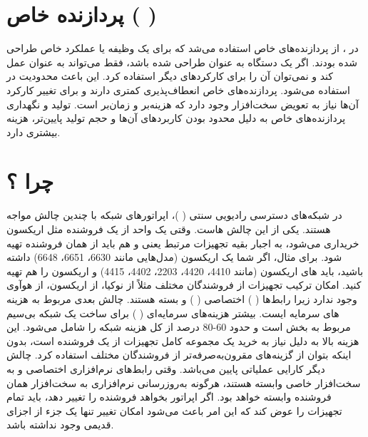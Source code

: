 \documentclass[landscape, 12pt]{report}
\begin{document}
 	         
\section*{پردازنده خاص  (
	)}
	در 
	، از پردازنده‌های خاص استفاده می‌شد که برای یک وظیفه یا عملکرد خاص طراحی شده بودند. اگر یک دستگاه به عنوان 
	 طراحی شده باشد، فقط می‌تواند به عنوان 
	 عمل کند و نمی‌توان آن را برای کارکردهای دیگر استفاده کرد. این باعث محدودیت در استفاده می‌شود. پردازنده‌های خاص انعطاف‌پذیری کمتری دارند و برای تغییر کارکرد آن‌ها نیاز به تعویض سخت‌افزار وجود دارد که هزینه‌بر و زمان‌بر است. تولید و نگهداری پردازنده‌های خاص به دلیل محدود بودن کاربردهای آن‌ها و حجم تولید پایین‌تر، هزینه بیشتری دارد.
	 
	 
\section*{چرا 
	 ؟}
	در شبکه‌های دسترسی رادیویی سنتی (
	)، اپراتورهای شبکه با چندین چالش مواجه هستند.
	  یکی از این چالش هاست. وقتی یک واحد
	    از یک فروشنده مثل اریکسون خریداری می‌شود، به اجبار بقیه تجهیزات مرتبط یعنی
	      و
	        هم باید از همان فروشنده تهیه شود. برای مثال، اگر شما یک
	         اریکسون (مدل‌هایی مانند 6630، 6651، 6648) داشته باشید، باید
	          های اریکسون (مانند 4410، 4420، 2203، 4402، 4415) و
	            اریکسون را هم تهیه کنید. امکان ترکیب تجهیزات از فروشندگان مختلف مثلاً
	              از نوکیا،
	                از اریکسون،
	                  از هوآوی وجود ندارد زیرا رابط‌ها (
	                  )  اختصاصی (
) و بسته هستند. چالش بعدی مربوط به هزینه های سرمایه ایست. بیشتر هزینه‌های سرمایه‌ای (
) برای ساخت یک شبکه بی‌سیم مربوط به بخش 
 است و حدود 60-80 درصد از کل هزینه شبکه را شامل می‌شود. این هزینه بالا به دلیل نیاز به خرید یک مجموعه کامل تجهیزات از یک فروشنده است، بدون اینکه بتوان از گزینه‌های مقرون‌به‌صرفه‌تر از فروشندگان مختلف استفاده کرد. چالش دیگر کارایی عملیاتی پایین می‌باشد. وقتی رابط‌های نرم‌افزاری اختصاصی و به سخت‌افزار خاصی وابسته هستند، هرگونه به‌روزرسانی نرم‌افزاری به سخت‌افزار همان فروشنده وابسته خواهد بود. اگر اپراتور بخواهد فروشنده را تغییر دهد، باید تمام تجهیزات را عوض کند که این امر باعث می‌شود امکان تغییر تنها یک جزء از اجزای
   قدیمی وجود نداشته باشد.
   
\end{document}
